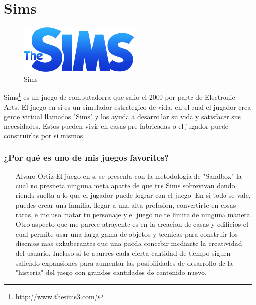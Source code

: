\section{Sims}

\begin{figure}[htbp]
\begin{center}
\includegraphics[width=.60\textwidth]{./imagenes/Logo_of_The_Sims_(2013).png}
\caption{Sims}
\label{Sims}
\end{center}
\end{figure}
Sims\footnote{\url{http://www.thesims3.com/}} es un juego de computadorra que salio el 2000 por parte de Electronic Arts. El juego en si es un simulador estrategico de vida, en el cual el jugador crea gente virtual llamados "Sims" y los ayuda a desarrollar su vida y satisfacer sus necesidades. Estos pueden vivir en casas pre-fabricadas o el jugador puede construirlas por si mismos.

\subsubsection{¿Por qué es uno de mis juegos favoritos?}
\begin{itemize}
\item[Alvaro Ortiz] El juego en si se presenta con la metodologia de "Sandbox" la cual no presneta ninguna meta aparte de que tus Sims sobrevivan dando rienda suelta a lo que el jugador puede lograr con el juego. En si todo se vale, puedes crear una familia, llegar a una alta profesion, convertirte en cosas raras, e incluso matar tu personaje y el juego no te limita de ninguna manera. Otro aspecto que me parece atrayente es en la creacion de casas y edificios el cual permite usar una larga gama de objetos y tecnicas para construir los disenios mas exhuberantes que una pueda concebir mediante la creatividad del usuario. Incluso si te aburres cada cierta cantidad de tiempo siguen saliendo expansiones para aumentar las posibilidades de desarrollo de la "historia" del juego con grandes cantidades de contenido nuevo.
\end{itemize}
